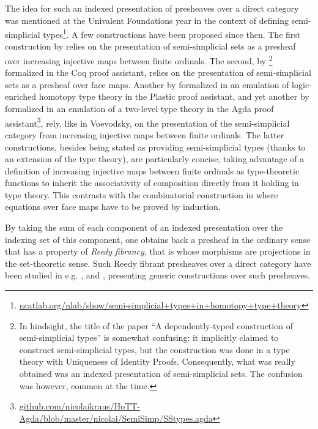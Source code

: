 \documentclass{art.cls/art}
\begin{document}
The idea for such an indexed presentation of presheaves over a direct category was mentioned at the Univalent Foundations year in the context of defining semi-simplicial types\footnote{\href{https://ncatlab.org/nlab/show/semi-simplicial+types+in+homotopy+type+theory}{ncatlab.org/nlab/show/semi-simplicial+types+in+homotopy+type+theory}}. A few constructions have been proposed since then. The first construction by \cite{voevodsky12} relies on the presentation of semi-simplicial sets as a presheaf over increasing injective maps between finite ordinals. The second, by \cite{herbelin15}\footnote{In hindsight, the title of the paper ``A dependently-typed construction of semi-simplicial types'' is somewhat confusing: it implicitly claimed to construct semi-simplicial types, but the construction was done in a type theory with Uniqueness of Identity Proofs. Consequently, what was really obtained was an indexed presentation of semi-simplicial sets. The confusion was however, common at the time.} formalized in the Coq proof assistant, relies on the presentation of semi-simplicial sets as a presheaf over face maps. Another by \cite{part15} formalized in an emulation of logic-enriched homotopy type theory in the Plastic proof assistant, and yet another by \cite{altenkirch16} formalized in an emulation of a two-level type theory in the Agda proof assistant\footnote{\href{https://github.com/nicolaikraus/HoTT-Agda/blob/master/nicolai/SemiSimp/SStypes.agda}{github.com/nicolaikraus/HoTT-Agda/blob/master/nicolai/SemiSimp/SStypes.agda}}, rely, like in Voevodsky, on the presentation of the semi-simplicial category from increasing injective maps between finite ordinals. The latter constructions, besides being stated as providing semi-simplicial types (thanks to an extension of the type theory), are particularly concise, taking advantage of a definition of increasing injective maps between finite ordinals as type-theoretic functions to inherit the associativity of composition directly from it holding in type theory. This contrasts with the combinatorial construction in \cite{herbelin15} where equations over face maps have to be proved by induction.

By taking the sum of each component of an indexed presentation over the indexing set of this component, one obtains back a presheaf in the ordinary sense that has a property of \emph{Reedy fibrancy}, that is whose morphisms are projections in the set-theoretic sense. Such Reedy fibrant presheaves over a direct category have been studied in e.g. \cite{shulman15}, \cite{kraus17} and \cite{annenkovCK17,AnnenkovCKS2023}, presenting generic constructions over such presheaves.
\end{document}

